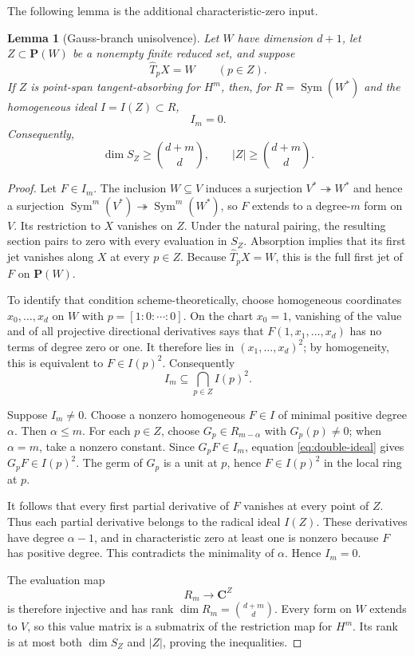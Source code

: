 \documentclass[11pt]{article}
\newtheorem{lemma}[theorem]{Lemma}
\newcommand{\PP}{\mathbf P}
\newcommand{\CC}{\mathbf C}
\newcommand{\Sym}{\operatorname{Sym}}
\begin{document}
The following lemma is the additional characteristic-zero input.

\begin{lemma}[Gauss-branch unisolvence]\label{lem:gauss-unisolvence}
Let $W$ have dimension $d+1$, let $Z\subset\PP(W)$ be a nonempty finite
reduced set, and suppose
\[
 \widehat T_pX=W\qquad(p\in Z).
\]
If $Z$ is point-span tangent-absorbing for $H^m$, then, for
$R=\Sym(W^*)$ and the homogeneous ideal $I=I(Z)\subset R$,
\[
 I_m=0.
\]
Consequently,
\[
 \dim S_Z\geq\binom{d+m}{d},\qquad
 |Z|\geq\binom{d+m}{d}.
\]
\end{lemma}

\begin{proof}
Let $F\in I_m$.  The inclusion $W\subseteq V$ induces a surjection
$V^*\twoheadrightarrow W^*$ and hence a surjection
$\Sym^m(V^*)\twoheadrightarrow\Sym^m(W^*)$, so $F$ extends to a degree-$m$
form on $V$.  Its restriction to $X$ vanishes on $Z$.  Under the natural
pairing, the resulting section pairs to zero with every evaluation in
$S_Z$.  Absorption implies that its first jet vanishes along $X$ at every
$p\in Z$.  Because $\widehat T_pX=W$, this is the full first jet of $F$ on
$\PP(W)$.

To identify that condition scheme-theoretically, choose homogeneous
coordinates $x_0,\ldots,x_d$ on $W$ with $p=[1:0:\cdots:0]$.  On the chart
$x_0=1$, vanishing of the value and of all projective directional derivatives
says that $F(1,x_1,\ldots,x_d)$ has no terms of degree zero or one.  It
therefore lies in $(x_1,\ldots,x_d)^2$; by homogeneity, this is equivalent to
$F\in I(p)^2$.  Consequently
\begin{equation}\label{eq:double-ideal}
 I_m\subseteq\bigcap_{p\in Z} I(p)^2.
\end{equation}

Suppose $I_m\neq0$.  Choose a nonzero homogeneous $F\in I$ of minimal
positive degree $\alpha$.  Then $\alpha\leq m$.  For each $p\in Z$, choose
$G_p\in R_{m-\alpha}$ with $G_p(p)\neq0$; when $\alpha=m$, take a nonzero
constant.  Since $G_pF\in I_m$, equation \eqref{eq:double-ideal} gives
$G_pF\in I(p)^2$.  The germ of $G_p$ is a unit at $p$, hence
$F\in I(p)^2$ in the local ring at $p$.

It follows that every first partial derivative of $F$ vanishes at every
point of $Z$.  Thus each partial derivative belongs to the radical ideal
$I(Z)$.  These derivatives have degree $\alpha-1$, and in characteristic
zero at least one is nonzero because $F$ has positive degree.  This
contradicts the minimality of $\alpha$.  Hence $I_m=0$.

The evaluation map
\[
 R_m\longrightarrow\CC^Z
\]
is therefore injective and has rank
$\dim R_m=\binom{d+m}{d}$.  Every form on $W$ extends to $V$, so this value
matrix is a submatrix of the restriction map for $H^m$.  Its rank is at
most both $\dim S_Z$ and $|Z|$, proving the inequalities.
\end{proof}
\end{document}
